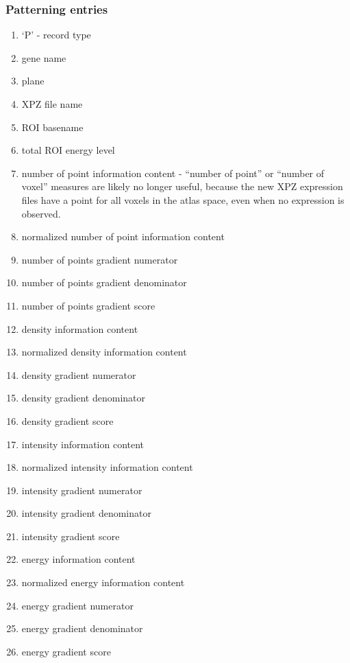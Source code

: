 \documentclass[10pt]{article}
\begin{document}
\subsubsection{Patterning entries}
\begin{enumerate}
\item `P' - record type
\item gene name
\item plane
\item XPZ file name
\item ROI basename
\item total ROI energy level
\item number of point information content - ``number of point'' or ``number of voxel'' measures are likely no longer useful, because the new XPZ expression files have a point for all voxels in the atlas space, even when no expression is observed.
\item normalized number of point information content
\item number of points gradient numerator
\item number of points gradient denominator
\item number of points gradient score

\item density information content
\item normalized density information content
\item density gradient numerator
\item density gradient denominator
\item density gradient score

\item intensity information content
\item normalized intensity information content
\item intensity gradient numerator
\item intensity gradient denominator
\item intensity gradient score

\item energy information content
\item normalized energy information content
\item energy gradient numerator
\item energy gradient denominator
\item energy gradient score

\end{enumerate}
\end{document}
